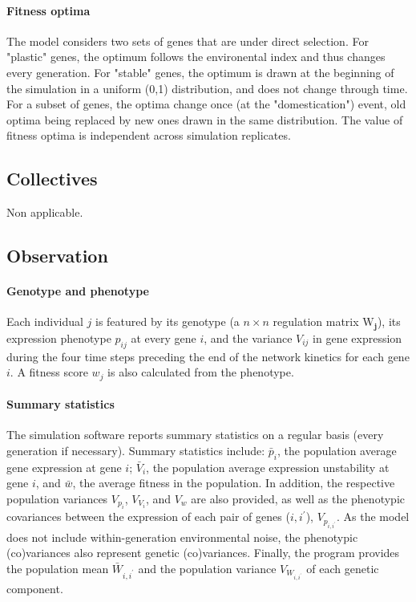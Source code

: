 \documentclass{article}
\begin{document}
\paragraph{Fitness optima} The model considers two sets of genes that are under direct selection. For "plastic" genes, the optimum follows the environental index and thus changes every generation. For "stable" genes, the optimum is drawn at the beginning of the simulation in a uniform (0,1) distribution, and does not change through time. For a subset of genes, the optima change once (at the "domestication") event, old optima being replaced by new ones drawn in the same distribution. The value of fitness optima is independent across simulation replicates. 

\subsection{Collectives}

Non applicable.

\subsection{Observation}

\paragraph{Genotype and phenotype} Each individual $j$ is featured by its genotype (a $n \times n$ regulation matrix $\bm{\mathrm W_j}$), its expression phenotype $p_{ij}$ at every gene $i$, and the variance $V_{ij}$ in gene expression during the four time steps preceding the end of the network kinetics for each gene $i$. A fitness score $w_j$ is also calculated from the phenotype. 

\paragraph{Summary statistics} The simulation software reports summary statistics on a regular basis (every generation if necessary). Summary statistics include: $\bar p_i$, the population average gene expression at gene $i$; $\bar V_i$, the population average expression unstability at gene $i$, and $\bar w$, the average fitness in the population. In addition, the respective population variances $V_{p_i}$, $V_{V_i}$, and $V_w$ are also provided, as well as the phenotypic covariances between the expression of each pair of genes ($i, i^\prime$), $V_{p_{i,i^\prime}}$. As the model does not include within-generation environmental noise, the phenotypic (co)variances also represent genetic (co)variances. Finally, the program provides the population mean $\bar W_{i,i^\prime}$ and the population variance $V_{W_{i,i^\prime}}$ of each genetic component. 
\end{document}
